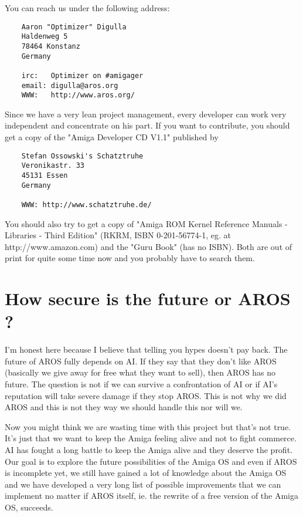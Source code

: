 You can reach us under the following address:

\begin{verbatim}
    Aaron "Optimizer" Digulla
    Haldenweg 5
    78464 Konstanz
    Germany

    irc:   Optimizer on #amigager
    email: digulla@aros.org
    WWW:   http://www.aros.org/
\end{verbatim}

Since we have a very lean project management, every developer can work
very independent and concentrate on his part. If you want to contribute,
you should get a copy of the "Amiga Developer CD V1.1" published by

\begin{verbatim}
    Stefan Ossowski's Schatztruhe
    Veronikastr. 33
    45131 Essen
    Germany

    WWW: http://www.schatztruhe.de/
\end{verbatim}

You should also try to get a copy of "Amiga ROM Kernel Reference Manuals -
Libraries - Third Edition" (RKRM, ISBN 0-201-56774-1,
eg. at http://www.amazon.com) and the "Guru Book" (has no ISBN). Both are
out of print for quite some time now and you probably have to search them.

\section{How secure is the future or AROS ?}

I'm honest here because I believe that telling you hypes doesn't pay back.
The future of AROS fully depends on AI. If they say that they don't like
AROS (basically we give away for free what they want to sell), then AROS
has no future. The question is not if we can survive a confrontation of
AI or if AI's reputation will take severe damage if they stop AROS. This
is not why we did AROS and this is not they way we should handle this nor
will we.

Now you might think we are wasting time with this project but that's not
true. It's just that we want to keep the Amiga feeling alive and not to
fight commerce. AI has fought a long battle to keep the Amiga alive and
they deserve the profit. Our goal is to explore the future possibilities
of the Amiga OS and even if AROS is incomplete yet, we still have gained a
lot of knowledge about the Amiga OS and we have developed a very long list
of possible improvements that we can implement no matter if AROS itself,
ie. the rewrite of a free version of the Amiga OS, succeeds.


